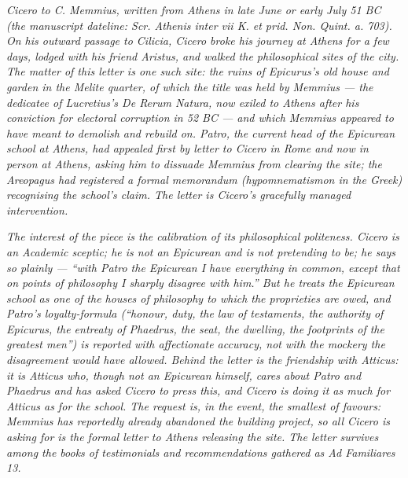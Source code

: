 
\textit{Cicero to C. Memmius, written from Athens in late
June or early July 51 BC (the manuscript dateline:
\textit{Scr. Athenis inter vii K. et prid. Non. Quint. a.
703}). On his outward passage to Cilicia, Cicero broke
his journey at Athens for a few days, lodged with his
friend Aristus, and walked the philosophical sites of
the city. The matter of this letter is one such site:
the ruins of Epicurus's old house and garden in the
Melite quarter, of which the title was held by Memmius
--- the dedicatee of Lucretius's \textit{De Rerum
Natura}, now exiled to Athens after his conviction for
electoral corruption in 52 BC --- and which Memmius
appeared to have meant to demolish and rebuild on. Patro,
the current head of the Epicurean school at Athens, had
appealed first by letter to Cicero in Rome and now in
person at Athens, asking him to dissuade Memmius from
clearing the site; the Areopagus had registered a
formal memorandum (\textit{hypomnematismon} in the
Greek) recognising the school's claim. The letter is
Cicero's gracefully managed intervention.}

\textit{The interest of the piece is the calibration of
its philosophical politeness. Cicero is an Academic
sceptic; he is not an Epicurean and is not pretending
to be; he says so plainly --- ``with Patro the Epicurean
I have everything in common, except that on points of
philosophy I sharply disagree with him.'' But he treats
the Epicurean school as one of the houses of philosophy
to which the proprieties are owed, and Patro's
loyalty-formula (``honour, duty, the law of testaments,
the authority of Epicurus, the entreaty of Phaedrus,
the seat, the dwelling, the footprints of the greatest
men'') is reported with affectionate accuracy, not with
the mockery the disagreement would have allowed. Behind
the letter is the friendship with Atticus: it is
Atticus who, though not an Epicurean himself, cares about
Patro and Phaedrus and has asked Cicero to press this,
and Cicero is doing it as much for Atticus as for the
school. The request is, in the event, the smallest of
favours: Memmius has reportedly already abandoned the
building project, so all Cicero is asking for is the
formal letter to Athens releasing the site. The letter
survives among the books of testimonials and
recommendations gathered as \textit{Ad Familiares} 13.}
